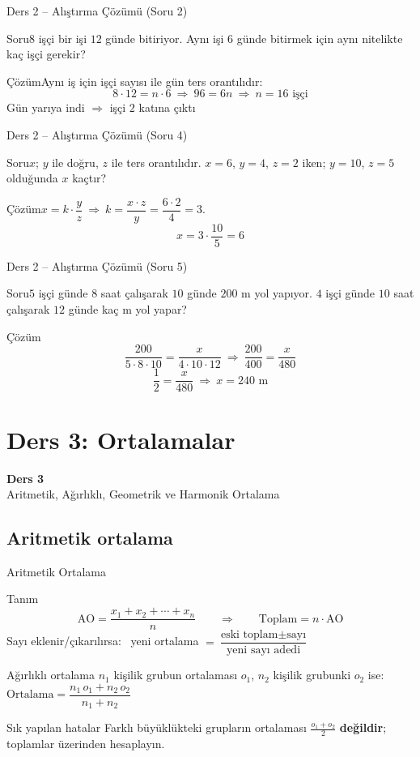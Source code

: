 \documentclass[aspectratio=169,11pt]{beamer}
\newcommand{\soru}[3]{%
\begin{frame}{#1}
  \begin{block}{Soru}\large #2\end{block}
  \pause
  \begin{exampleblock}{Çözüm}\large #3\end{exampleblock}
\end{frame}}
\begin{document}
\soru{Ders 2 -- Alıştırma Çözümü (Soru 2)}
{\(8\) işçi bir işi \(12\) günde bitiriyor. Aynı işi \(6\) günde bitirmek için aynı nitelikte kaç işçi gerekir?}
{Aynı iş için işçi sayısı ile gün ters orantılıdır:
\[8\cdot 12=n\cdot 6\ \Rightarrow\ 96=6n\ \Rightarrow\ n=16\text{ işçi}\]
Gün yarıya indi \(\Rightarrow\) işçi \(2\) katına çıktı \checkmark}

\soru{Ders 2 -- Alıştırma Çözümü (Soru 4)}
{\(x\); \(y\) ile doğru, \(z\) ile ters orantılıdır. \(x=6\), \(y=4\), \(z=2\) iken; \(y=10\), \(z=5\) olduğunda \(x\) kaçtır?}
{\(x=k\cdot\dfrac{y}{z}\ \Rightarrow\ k=\dfrac{x\cdot z}{y}=\dfrac{6\cdot 2}{4}=3\).
\[x=3\cdot\frac{10}{5}=6\]}

\soru{Ders 2 -- Alıştırma Çözümü (Soru 5)}
{\(5\) işçi günde \(8\) saat çalışarak \(10\) günde \(200\) m yol yapıyor. \(4\) işçi günde \(10\) saat çalışarak \(12\) günde kaç m yol yapar?}
{\[\frac{200}{5\cdot 8\cdot 10}=\frac{x}{4\cdot 10\cdot 12}\ \Rightarrow\ \frac{200}{400}=\frac{x}{480}\]
\[\frac{1}{2}=\frac{x}{480}\ \Rightarrow\ x=240\text{ m}\]}


\section{Ders 3: Ortalamalar}
\begin{frame}
\centering\Large\color{anamavi}\textbf{Ders 3}\\[6pt]\normalsize Aritmetik, Ağırlıklı, Geometrik ve Harmonik Ortalama
\end{frame}

\subsection{Aritmetik ortalama}
\begin{frame}{Aritmetik Ortalama}
\begin{block}{Tanım}
\[\text{AO}=\frac{x_1+x_2+\cdots+x_n}{n}\qquad\Longrightarrow\qquad \text{Toplam}=n\cdot\text{AO}\]
Sayı eklenir/çıkarılırsa: \ yeni ortalama \(=\dfrac{\text{eski toplam}\pm\text{sayı}}{\text{yeni sayı adedi}}\)
\end{block}
\begin{block}{Ağırlıklı ortalama}
\(n_1\) kişilik grubun ortalaması \(o_1\), \(n_2\) kişilik grubunki \(o_2\) ise: \ \(\text{Ortalama}=\dfrac{n_1\,o_1+n_2\,o_2}{n_1+n_2}\)
\end{block}
\begin{alertblock}{Sık yapılan hatalar}
Farklı büyüklükteki grupların ortalaması \(\frac{o_1+o_2}{2}\) \textbf{değildir}; toplamlar üzerinden hesaplayın.
\end{alertblock}
\end{frame}
\end{document}
